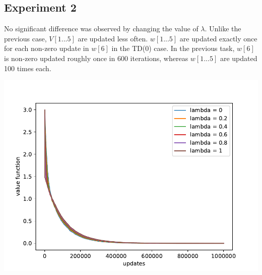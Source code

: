 \documentclass[11pt]{article}
\begin{document}
\subsection{Experiment 2}
No significant difference was observed by changing the value of $\lambda$. Unlike the previous case, $V[1...5]$ are updated less often. $w[1...5]$ are updated exactly once for each non-zero update in $w[6]$ in the TD(0) case. In the previous task, $w[6]$ is non-zero updated roughly once in 600 iterations, whereas $w[1...5]$ are updated 100 times each. 
\begin{center}
\includegraphics[width=15cm]{expt2.pdf}
\end{center}
\end{document}
